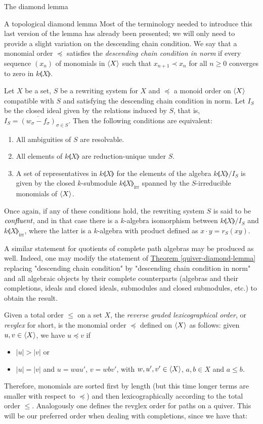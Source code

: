 \begin{chapter}{The diamond lemma}
\begin{section}{A topological diamond lemma}
Most of the terminology needed to introduce this last version of the lemma has already been presented; we will only need to provide a slight variation on the descending chain condition. We say that a monomial order $\preceq$ satisfies the \emph{descending chain condition in norm} if every sequence $(x_n)$ of monomials in $\langle X\rangle$ such that $x_{n+1}\prec x_n$ for all $n\geq 0$ converges to zero in $k\llangle X\rrangle$.

\begin{thm} Let $X$ be a set, $S$ be a rewriting system for $X$ and $\preceq$ a monoid order on $\langle X\rangle$ compatible with $S$ and satisfying the descending chain condition in norm. Let $I_S$ be the closed ideal given by the relations induced by $S$, that is, $I_S=\overline{(w_\sigma-f_\sigma)}_{\sigma\in S}$. Then the following conditions are equivalent:
\begin{enumerate}
\item All ambiguities of $S$ are resolvable.
\item All elements of $k\llangle X\rrangle$ are reduction-unique under $S$.
\item A set of representatives in $k\llangle X\rrangle$ for the elements of the algebra $k\llangle X\rrangle/I_S$ is given by the closed $k$-submodule $k\llangle X\rrangle_{\mathrm{irr}}$ spanned by the $S$-irreducible monomials of $\langle X\rangle$.
\end{enumerate}
Once again, if any of these conditions hold, the rewriting system $S$ is said to be $\emph{confluent}$, and in that case  there is a $k$-algebra isomorphism between $k\llangle X\rrangle/I_S$ and $k\llangle X\rrangle_{\mathrm{irr}}$, where the latter is a $k$-algebra with product defined as $x\cdot y= r_S(xy)$.
\end{thm}

A similar statement for quotients of complete path algebras may be produced as well. Indeed, one may modify the statement of \hyperref[quiver-diamond-lemma]{Theorem \ref*{quiver-diamond-lemma}} replacing "descending chain condition" by "descending chain condition in norm" and all algebraic objects by their complete counterparts (algebras and their completions, ideals and closed ideals, submodules and closed submodules, etc.) to obtain the result.

Given a total order $\leq$ on a set $X$, the \emph{reverse graded lexicographical order}, or \emph{revglex} for short, is the monomial order $\preceq$ defined on $\langle X\rangle$ as follows: given $u,v\in \langle X\rangle$, we have $u\preceq v$ if
\begin{itemize}
\item $|u| > |v|$ or
\item $|u| = |v|$ and $u=wau'$, $v=wbv'$, with $w,u',v'\in \langle X\rangle$, $a,b\in X$ and $a\leq b$.
\end{itemize}
Therefore, monomials are sorted first by length (but this time longer terms are smaller with respect to $\preceq$) and then lexicographically according to the total order $\leq$. Analogously one defines the revglex order for paths on a quiver. This will be our preferred order when dealing with completions, since we have that:


\end{section}
\end{chapter}
